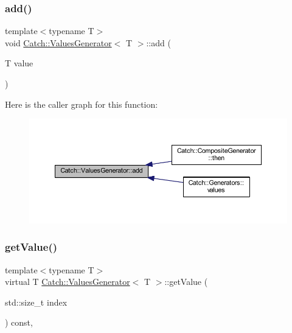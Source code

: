 \subsubsection{\texorpdfstring{add()}{add()}}
{\footnotesize\ttfamily template$<$typename T$>$ \\
void \hyperlink{class_catch_1_1_values_generator}{Catch\+::\+Values\+Generator}$<$ T $>$\+::add (\begin{DoxyParamCaption}\item[{T}]{value }\end{DoxyParamCaption})\hspace{0.3cm}{\ttfamily [inline]}}

Here is the caller graph for this function\+:\nopagebreak
\begin{figure}[H]
\begin{center}
\leavevmode
\includegraphics[width=350pt]{class_catch_1_1_values_generator_a8412c8ce5d9d4fc6ff06d5246d56d538_icgraph}
\end{center}
\end{figure}
\hypertarget{class_catch_1_1_values_generator_a9674c8b70d562d2d68154de92dd1810a}{}\label{class_catch_1_1_values_generator_a9674c8b70d562d2d68154de92dd1810a} 
\subsubsection{\texorpdfstring{get\+Value()}{getValue()}}
{\footnotesize\ttfamily template$<$typename T$>$ \\
virtual T \hyperlink{class_catch_1_1_values_generator}{Catch\+::\+Values\+Generator}$<$ T $>$\+::get\+Value (\begin{DoxyParamCaption}\item[{std\+::size\+\_\+t}]{index }\end{DoxyParamCaption}) const\hspace{0.3cm}{\ttfamily [inline]}, {\ttfamily [virtual]}}




